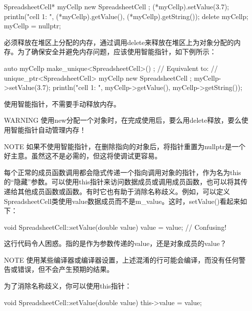 \begin{cpp}
SpreadsheetCell* myCellp { new SpreadsheetCell { } };
(*myCellp).setValue(3.7);
println("cell 1: {} {}", (*myCellp).getValue(), (*myCellp).getString());
delete myCellp;
myCellp = nullptr;
\end{cpp}

必须释放在堆区上分配的内存，通过调用delete来释放在堆区上为对象分配的内存。为了确保安全并避免内存问题，应该使用智能指针，如下例所示：

\begin{cpp}
auto myCellp { make_unique<SpreadsheetCell>() };
// Equivalent to:
// unique_ptr<SpreadsheetCell> myCellp { new SpreadsheetCell { } };
myCellp->setValue(3.7);
println("cell 1: {} {}", myCellp->getValue(), myCellp->getString());
\end{cpp}

使用智能指针，不需要手动释放内存。

\begin{myWarning}{WARNING}
使用new分配一个对象时，在完成使用后，要么用delete释放，要么使用智能指针自动管理内存！
\end{myWarning}

\begin{myNotic}{NOTE}
如果不使用智能指针，在删除指向的对象后，将指针重置为nullptr是一个好主意。虽然这不是必需的，但这将使调试更容易。
\end{myNotic}


每个正常的成员函数调用都会隐式传递一个指向调用对象的指针，作为名为this的“隐藏”参数。可以使用this指针来访问数据成员或调用成员函数，也可以将其传递给其他成员函数或函数。有时它也有助于消除名称歧义。例如，可以定义SpreadsheetCell类使用value数据成员而不是m\_value。这时，setValue()看起来如下：

\begin{cpp}
void SpreadsheetCell::setValue(double value)
{
    value = value; // Confusing!
}
\end{cpp}

这行代码令人困惑。指的是作为参数传递的value，还是对象成员的value？

\begin{myNotic}{NOTE}
使用某些编译器或编译器设置，上述混淆的行可能会编译，而没有任何警告或错误，但不会产生预期的结果。
\end{myNotic}

为了消除名称歧义，你可以使用this指针：

\begin{cpp}
void SpreadsheetCell::setValue(double value)
{
    this->value = value;
}
\end{cpp}

